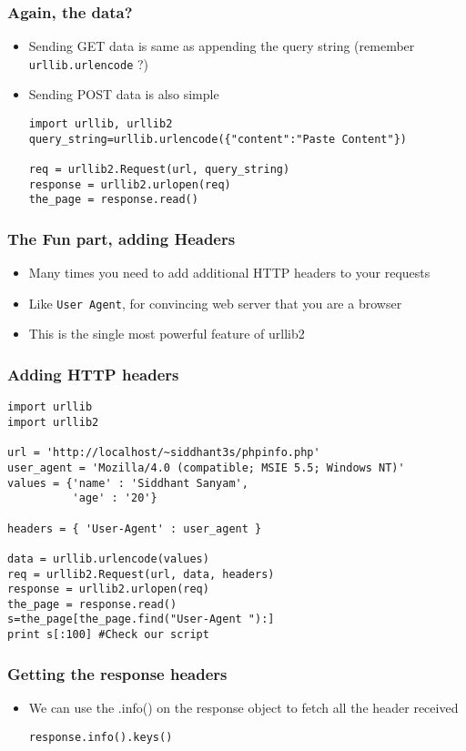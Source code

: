 \documentclass{beamer}
\begin{document}
\begin{frame}[fragile]
\frametitle{Again, the data?}
\label{sec-8_5}


\begin{itemize}
\item Sending GET data is same as appending the query string (remember \texttt{urllib.urlencode} ?)
\item Sending POST data is also simple
\begin{verbatim}
import urllib, urllib2
query_string=urllib.urlencode({"content":"Paste Content"})

req = urllib2.Request(url, query_string)
response = urllib2.urlopen(req)
the_page = response.read()
\end{verbatim}
\end{itemize}
\end{frame}
\begin{frame}
\frametitle{The Fun part, adding Headers}
\label{sec-8_6}


\begin{itemize}
\item Many times you need to add additional HTTP headers to your requests
\item Like \texttt{User Agent}, for convincing web server that you are a browser
\item This is the single most powerful feature of urllib2
\end{itemize}
\end{frame}
\begin{frame}[fragile]
\frametitle{Adding HTTP headers}
\label{sec-8_7}

\begin{verbatim}
import urllib
import urllib2

url = 'http://localhost/~siddhant3s/phpinfo.php'
user_agent = 'Mozilla/4.0 (compatible; MSIE 5.5; Windows NT)'
values = {'name' : 'Siddhant Sanyam',
          'age' : '20'}

headers = { 'User-Agent' : user_agent }

data = urllib.urlencode(values)
req = urllib2.Request(url, data, headers)
response = urllib2.urlopen(req)
the_page = response.read()
s=the_page[the_page.find("User-Agent "):]
print s[:100] #Check our script
\end{verbatim}
\end{frame}
\begin{frame}[fragile]
\frametitle{Getting the response headers}
\label{sec-8_8}


\begin{itemize}
\item We can use the .info() on the response object to fetch all the header received
   
\begin{verbatim}
response.info().keys()
\end{verbatim}
\end{itemize}
\end{frame}
\end{document}
